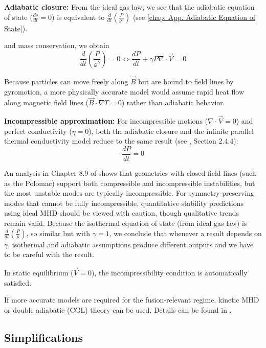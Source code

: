\begin{enumerate}
    \textbf{Adiabatic closure:}
    From the ideal gas law, we see that the adiabatic equation of state ($\frac{ds}{dt}=0$) is equivalent
     to $\frac{d}{dt}(\frac{P}{\varrho^\gamma})$ (see \autoref{chap: App. Adiabatic Equation of State}).
    
    and mass conservation, we obtain
    \[
        \frac{d}{dt}\left(\frac{P}{\varrho^\gamma}\right) = 0 \iff \frac{dP}{dt} + \gamma P \nabla \cdot \vec{V} = 0
    \]
    
    Because particles can move freely along $\vec{B}$ but are bound to field lines by gyromotion, 
    a more physically accurate model would assume rapid heat flow along magnetic field lines 
    ($\vec{B}\cdot\nabla T = 0$) rather than adiabatic behavior.

    \textbf{Incompressible approximation:} For incompressible motions ($\nabla \cdot \vec{V} = 0$) 
    and perfect conductivity ($\eta = 0$), both the adiabatic closure and the infinite parallel 
    thermal conductivity model reduce to the same result (see \cite{Freidberg2014}, Section 2.4.4):
    \[
    \frac{dP}{dt} = 0
    \]

    An analysis in Chapter 8.9 of \cite{Freidberg2014} shows that geometries with closed field lines 
    (such as the Polomac) support both compressible and incompressible instabilities, but the most 
    unstable modes are typically incompressible. For symmetry-preserving modes that cannot be fully 
    incompressible, quantitative stability predictions using ideal MHD should be viewed with caution, 
    though qualitative trends remain valid.
    Because the isothermal equation of state (from ideal gas law) is $\frac{d}{dt}(\frac{P}{\varrho})$,
    so similar but with $\gamma=1$, we conclude that whenever a result depends on $\gamma$, isothermal
    and adiabatic assumptions produce different outputs and we have to be careful with the result.


    In static equilibrium ($\vec{V} = 0$), the incompressibility condition is automatically satisfied.

    If more accurate models are required for the fusion-relevant regime, kinetic MHD or double 
    adiabatic (CGL) theory can be used. Details can be found in \cite{Freidberg2014}.





\end{enumerate}



\subsection{Simplifications}


